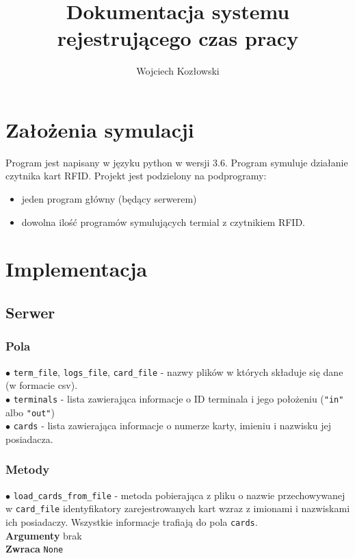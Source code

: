\documentclass{article}
\title{Dokumentacja systemu rejestrującego czas pracy}
\author{Wojciech Kozłowski}
\begin{document}
\maketitle
\section{Założenia symulacji}
Program jest napisany w języku python w wersji 3.6.
Program symuluje działanie czytnika kart RFID.
Projekt jest podzielony na podprogramy:
\begin{itemize}
    \item jeden program główny (będący serwerem)
    \item dowolna ilość programów symulujących termial z czytnikiem
        RFID.
\end{itemize}

\section{Implementacja}
\subsection{Serwer}
\subsubsection{Pola}

$\bullet$ \texttt{term\_file}, \texttt{logs\_file}, 
\texttt{card\_file} - nazwy plików w 
których składuje się dane (w formacie csv). \\
$\bullet$ \texttt{terminals} - lista zawierająca informacje o 
ID terminala i jego położeniu (\texttt{"in"} albo \texttt{"out"})\\
$\bullet$ \texttt{cards} - lista zawierająca informacje o 
numerze karty, imieniu i nazwisku jej posiadacza. \\
\subsubsection{Metody}
\hspace{0.13in}
$\bullet$ \texttt{load\_cards\_from\_file} - metoda pobierająca z pliku
o nazwie przechowywanej w \texttt{card\_file} identyfikatory
zarejestrowanych kart wzraz z imionami i nazwiskami ich posiadaczy.
Wszystkie informacje trafiają do pola \texttt{cards}. \\
\textbf{Argumenty} brak \\ \textbf{Zwraca} \texttt{None} \\
\end{document}
